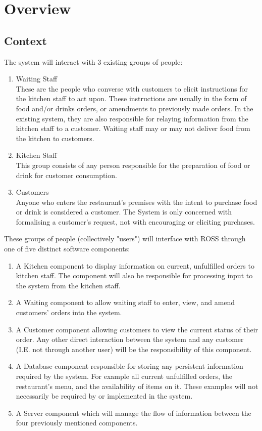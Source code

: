 \documentclass[11pt, a4paper]{report}
\begin{document}
\section{Overview} \label{sec:Overview}
\subsection{Context} \label{subsec:Context}

The system will interact with 3 existing groups of people:
\begin{enumerate}
\item Waiting Staff\\
These are the people who converse with customers to elicit instructions for the kitchen staff to act upon. These instructions are usually in the form of food and/or drinks orders, or amendments to previously made orders. In the existing system, they are also responsible for relaying information from the kitchen staff to a customer. Waiting staff may or may not deliver food from the kitchen to customers.
\item Kitchen Staff\\
This group consists of any person responsible for the preparation of food or drink for customer consumption.
\item Customers\\
Anyone who enters the restaurant's premises with the intent to purchase food or drink is considered a customer. The System is only concerned with formalising a customer's request, not with encouraging or eliciting purchases.
\end{enumerate}

\noindent
These groups of people (collectively "users") will interface with ROSS through one of five distinct software components:
\begin{enumerate}
\item A Kitchen component to display information on current, unfulfilled orders to kitchen staff. The component will also be responsible for processing input to the system from the kitchen staff.
\item A Waiting component to allow waiting staff to enter, view, and amend customers' orders into the system.
\item A Customer component allowing customers to view the current status of their order. Any other direct interaction between the system and any customer (I.E. not through another user) will be the responsibility of this component.
\item A Database component responsible for storing any persistent information required by the system. For example all current unfulfilled orders, the restaurant's menu, and the availability of items on it. These examples will not necessarily be required by or implemented in the system.
\item A Server component which will manage the flow of information between the four previously mentioned components.
\end{enumerate}
\end{document}
